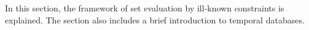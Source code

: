 In this section, the framework of set evaluation by ill-known constraints \cite{Pons2011} is explained. The section also includes a brief introduction to temporal databases.


% 

